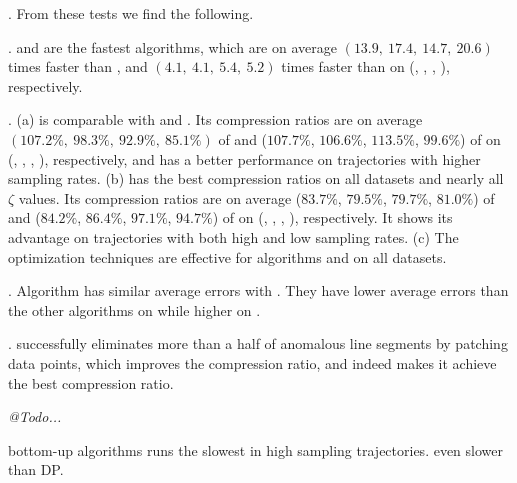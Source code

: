 .
From these tests we find the following.


\emph{}. \operb and \operba are the fastest algorithms, which are on average $(13.9, ~17.4, ~14.7, {~20.6})$ times faster than \dpa, and $(4.1,~4.1,~5.4, {~5.2})$
times faster than \fbqsa on (\taxi, \truck, \sercar, \geolife), respectively.

\emph{}. (a) \operb is comparable {with \fbqsa and \dpa}. Its compression ratios are on average $(107.2\%, ~98.3\%, ~92.9\%, ~85.1\%)$ of \fbqsa and ($107.7\%$, $106.6\%$, $113.5\%$, $99.6\%$) of \dpa on (\taxi, \truck, \sercar, \geolife), respectively, and \operb has a better performance on trajectories with higher sampling rates.
(b) \operba has the best compression ratios on all datasets and nearly all $\zeta$ values.
Its compression ratios are on average {($83.7\%$, $79.5\%$, $79.7\%$, $81.0\%$)} of \fbqsa and {($84.2\%$, $86.4\%$, $97.1\%$, $94.7\%$)} of \dpa on (\taxi, \truck, \sercar, \geolife), respectively.
It shows its advantage on trajectories with both high and low sampling rates.
(c) The optimization techniques are effective for algorithms \operb and \operba on all datasets.

\emph{}. {Algorithm \operb has similar average errors with \operba. They have lower average errors than the other algorithms on \taxi while higher on \sercar.}

\emph{}. \operba  successfully eliminates more than a half of anomalous line segments by patching data points,
which improves the compression ratio, and indeed makes it achieve the best compression ratio.


\em
@Todo...

bottom-up algorithms runs the slowest in high sampling trajectories. even slower than DP.

\em




